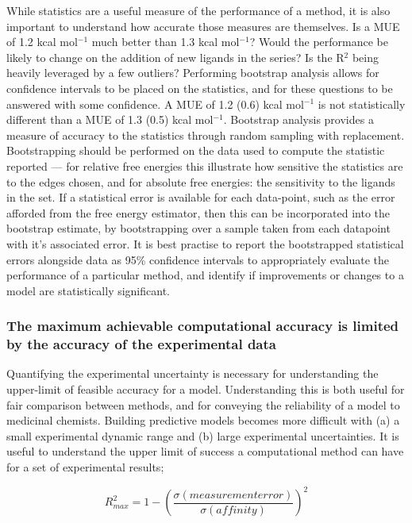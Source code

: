 \documentclass[9pt,bestpractices]{livecoms}
\begin{document}
While statistics are a useful measure of the performance of a method, it is also important to understand how accurate those measures are themselves. Is a MUE of 1.2 kcal mol$^{-1}$ much better than 1.3 kcal mol$^{-1}$? Would the performance be likely to change on the addition of new ligands in the series? Is the R$^2$ being heavily leveraged by a few outliers? Performing bootstrap analysis allows for confidence intervals to be placed on the statistics, and for these questions to be answered with some confidence. A MUE of 1.2 (0.6) kcal mol$^{-1}$ is not statistically different than a MUE of 1.3 (0.5) kcal mol$^{-1}$. Bootstrap analysis provides a measure of accuracy to the statistics through random sampling with replacement. Bootstrapping should be performed on the data used to compute the statistic reported --- for relative free energies this illustrate how sensitive the statistics are to the edges chosen, and for absolute free energies: the sensitivity to the ligands in the set. If a statistical error is available for each data-point, such as the error afforded from the free energy estimator, then this can be incorporated into the bootstrap estimate, by bootstrapping over a sample taken from each datapoint with it's associated error. It is best practise to report the bootstrapped statistical errors alongside data as 95\% confidence intervals to appropriately evaluate the performance of a particular method, and identify if improvements or changes to a model are statistically significant.

\subsubsection{The maximum achievable computational accuracy is limited by the accuracy of the experimental data}\label{section:expt-accuracy}

Quantifying the experimental uncertainty is necessary for understanding the upper-limit of feasible accuracy for a model. Understanding this is both useful for fair comparison between methods, and for conveying the reliability of a model to medicinal chemists\cite{griffen2020chemists}. Building predictive models becomes more difficult with (a) a small experimental dynamic range and (b) large experimental uncertainties. It is useful to understand the upper limit of success a computational method can have for a set of experimental results;

\begin{equation}\label{eqn:r2max}
    R^2_{max} = 1 - (\frac{\sigma(measurement  error)}{\sigma(affinity)}) ^2
\end{equation}
\end{document}
